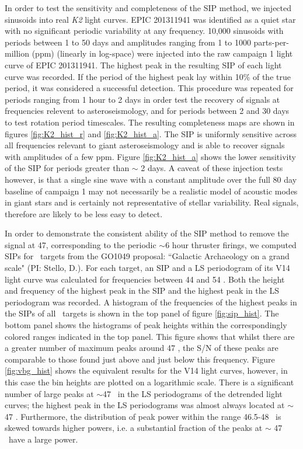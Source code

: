 \documentclass[useAMS, usenatbib, preprint, 12pt]{aastex}
\begin{document}
In order to test the sensitivity and completeness of the SIP method,
we injected sinusoids into real {\it K2} light curves.
EPIC 201311941 was identified as a quiet star with no significant periodic
variability at any frequency.
10,000 sinusoids with periods between 1 to 50 days and amplitudes ranging from
1 to 1000 parts-per-million (ppm) (linearly in log-space) were injected into
the raw campaign 1 light curve of EPIC 201311941.
The highest peak in the resulting SIP of each light curve was recorded.
If the period of the highest peak lay within 10\% of the true period, it was
considered a successful detection.
This procedure was repeated for periods ranging from 1 hour to 2 days in order
test the recovery of signals at frequencies relevent to asteroseismology,
and for periods between 2 and 30 days to test rotation period timescales.
The resulting completeness maps are shown in figures \ref{fig:K2_hist_r} and
\ref{fig:K2_hist_a}.
The SIP is uniformly sensitive across all frequencies relevant to giant
asteroseismology and is able to recover signals with amplitudes of a few ppm.
Figure \ref{fig:K2_hist_a} shows the lower sensitivity of the SIP for periods
greater than $\sim$ 2 days.
A caveat of these injection tests however, is that a single sine wave with
a constant amplitude over the full 80 day baseline of campaign 1 may not
necessarily be a realistic model of acoustic modes in giant stars and is
certainly not representative of stellar variability.
Real signals, therefore are likely to be less easy to detect.

In order to demonstrate the consistent ability of the SIP method
to remove the signal at 47\uHz, corresponding to the periodic $\sim$6 hour
thruster firings, we computed SIPs for \nGO\ targets from the GO1049
proposal: ``Galactic Archaeology on a grand scale" (PI: Stello, D.).
For each target, an SIP and a LS periodogram of its
V14 light curve was calculated for frequencies between
44 and 54 \uHz.
Both the height and frequency of the highest peak in the SIP and the highest
peak in the LS periodogram was recorded.
A histogram of the frequencies of the highest peaks in the SIPs of all \nGO\
targets is shown in the top panel of figure \ref{fig:sip_hist}.
The bottom panel shows the histograms of peak heights within the
correspondingly colored ranges indicated in the top panel.
This figure shows that whilst there are a greater number of maximum peaks
around 47 \uHz, the S/N of these peaks are comparable to those found just
above and just below this frequency.
Figure \ref{fig:vbg_hist} shows the equivalent results for the
V14 light curves, however, in this case the bin heights are
plotted on a logarithmic scale.
There is a significant number of large peaks at $\sim$47 \uHz\ in the LS
periodograms of the detrended light curves; the highest peak in the LS
periodograms was almost always located at $\sim$ 47 \uHz.
Furthermore, the distribution of peak power within the range 46.5-48 \uHz\ is
skewed towards higher powers, i.e. a substantial fraction of the peaks at
$\sim$ 47 \uHz\ have a large power.
\end{document}
